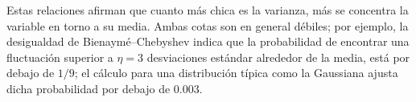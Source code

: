 Estas  relaciones  afirman que  cuanto  m\'as chica  es  la  varianza, m\'as  se
concentra la variable en torno a su media. Ambas cotas son en general d\'ebiles;
por  ejemplo,  la  desigualdad de Bienaym\'e--Chebyshev indica  que  la
probabilidad  de encontrar  una fluctuaci\'on  superior a  $\eta = 3$ desviaciones
est\'andar alrededor de la media, est\'a  por debajo de $1/9$; el c\'alculo para
una  distribuci\'on t\'ipica  como la  Gaussiana ajusta  dicha  probabilidad por
debajo de $0.003$.


